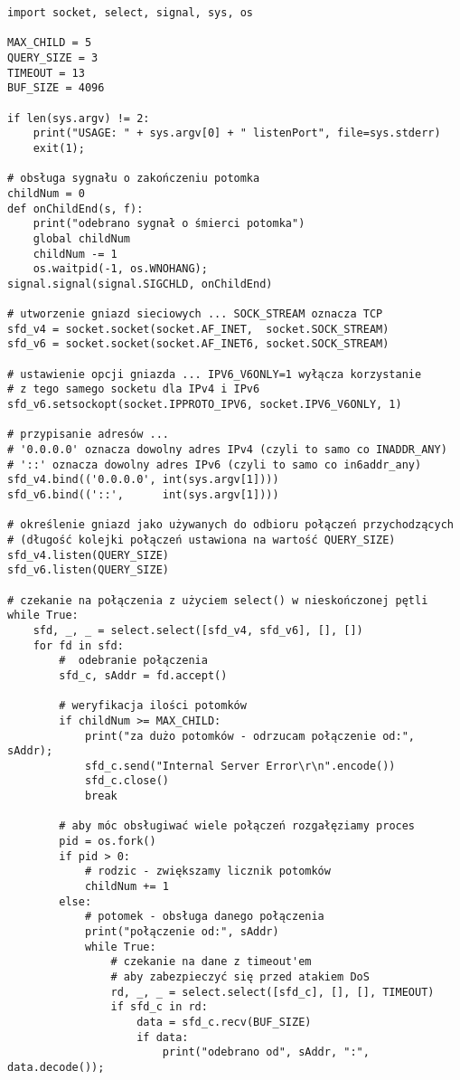 \dbEntryCheckResults
\begin{Verbatim}
import socket, select, signal, sys, os

MAX_CHILD = 5
QUERY_SIZE = 3
TIMEOUT = 13
BUF_SIZE = 4096

if len(sys.argv) != 2:
    print("USAGE: " + sys.argv[0] + " listenPort", file=sys.stderr)
    exit(1);

# obsługa sygnału o zakończeniu potomka
childNum = 0
def onChildEnd(s, f):
    print("odebrano sygnał o śmierci potomka")
    global childNum
    childNum -= 1
    os.waitpid(-1, os.WNOHANG);
signal.signal(signal.SIGCHLD, onChildEnd)

# utworzenie gniazd sieciowych ... SOCK_STREAM oznacza TCP
sfd_v4 = socket.socket(socket.AF_INET,  socket.SOCK_STREAM)
sfd_v6 = socket.socket(socket.AF_INET6, socket.SOCK_STREAM)

# ustawienie opcji gniazda ... IPV6_V6ONLY=1 wyłącza korzystanie
# z tego samego socketu dla IPv4 i IPv6
sfd_v6.setsockopt(socket.IPPROTO_IPV6, socket.IPV6_V6ONLY, 1)

# przypisanie adresów ...
# '0.0.0.0' oznacza dowolny adres IPv4 (czyli to samo co INADDR_ANY)
# '::' oznacza dowolny adres IPv6 (czyli to samo co in6addr_any)
sfd_v4.bind(('0.0.0.0', int(sys.argv[1])))
sfd_v6.bind(('::',      int(sys.argv[1])))

# określenie gniazd jako używanych do odbioru połączeń przychodzących
# (długość kolejki połączeń ustawiona na wartość QUERY_SIZE)
sfd_v4.listen(QUERY_SIZE)
sfd_v6.listen(QUERY_SIZE)

# czekanie na połączenia z użyciem select() w nieskończonej pętli
while True:
    sfd, _, _ = select.select([sfd_v4, sfd_v6], [], [])
    for fd in sfd:
        #  odebranie połączenia
        sfd_c, sAddr = fd.accept()
        
        # weryfikacja ilości potomków
        if childNum >= MAX_CHILD:
            print("za dużo potomków - odrzucam połączenie od:", sAddr);
            sfd_c.send("Internal Server Error\r\n".encode())
            sfd_c.close()
            break
        
        # aby móc obsługiwać wiele połączeń rozgałęziamy proces
        pid = os.fork()
        if pid > 0:
            # rodzic - zwiększamy licznik potomków
            childNum += 1
        else:
            # potomek - obsługa danego połączenia
            print("połączenie od:", sAddr)
            while True:
                # czekanie na dane z timeout'em
                # aby zabezpieczyć się przed atakiem DoS
                rd, _, _ = select.select([sfd_c], [], [], TIMEOUT)
                if sfd_c in rd:
                    data = sfd_c.recv(BUF_SIZE)
                    if data:
                        print("odebrano od", sAddr, ":", data.decode());
\end{Verbatim}
